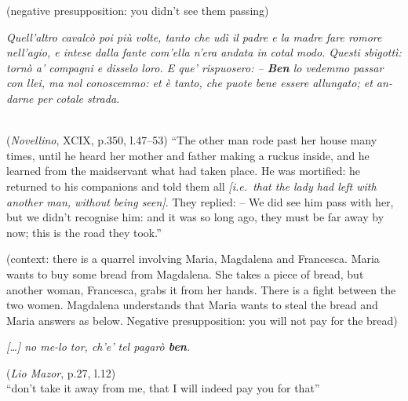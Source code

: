 \documentclass[output=paper]{langsci/langscibook}
\begin{document}
\ea\label{ex:key:12.10}
	(negative presupposition: you didn’t see them passing)\\
    \begin{italian}\emph{Quell’altro cavalcò poi più volte, tanto che udì il
    padre e la madre fare romore nell’agio, e intese dalla fante com'ella
    n’era andata in cotal modo. Questi sbigottì: tornò a’ compagni e disselo
    loro. E que’ rispuosero: – \textbf{Ben} lo vedemmo passar con llei, ma nol
    conoscemmo: et è tanto, che puote bene essere allungato; et andarne per cotale
    strada.}\end{italian}\\
	(\emph{Novellino}, XCIX, p.350, l.47--53)\hfill
    \enquote{The other man rode past her house many times, until he heard her
    mother and father making a ruckus inside, and he learned from the
    maidservant what had taken place. He was mortified: he returned to his
    companions and told them all \emph{[i.e.\ that the lady had left with
    another man, without being seen]}. They replied: -- We did see him pass
    with her, but we didn’t recognise him: and it was so long ago, they
    must be far away by now; this is the road they took.}
\z

\ea\label{ex:key:12.11}
    (context: there is a quarrel involving Maria, Magdalena and Francesca.
    Maria wants to buy some bread from Magdalena. She takes a piece of bread,
    but another woman, Francesca, grabs it from her hands. There is a fight
    between the two women. Magdalena understands that Maria wants to steal the
    bread and Maria answers as below. Negative presupposition: you will not pay
    for the bread)\\
    \begin{italian}\emph{[\dots] no me-lo tor, ch’e’ tel pagarò
    \textbf{ben}.}\end{italian}\hfill
	(\emph{Lio Mazor}, p.27, l.12)\\
    \enquote{don’t take it away from me, that I will indeed pay you for that}
\z\largerpage[2]
\end{document}
